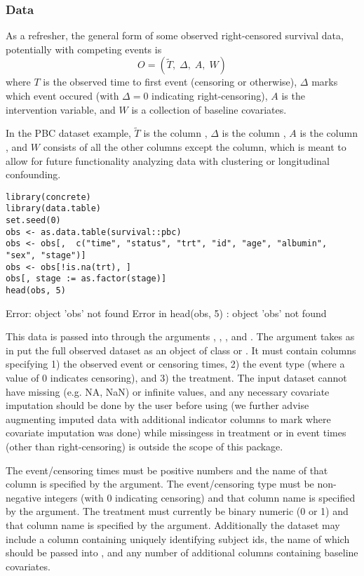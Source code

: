\documentclass{report}
\newcommand{\1}{\ensuremath{\mathbf{1}}}
\newcommand{\T}{\ensuremath{\widetilde{T}}}
\renewcommand{\L}{\ensuremath{W}}
\begin{document}
\subsubsection{Data}
\label{ObservedDataConcrete}
As a refresher, the general form of some observed right-censored survival data, potentially with competing events is
\[ O = \left( \T ,\; \Delta ,\; A ,\; \L  \right) \]
where \(T\) is the observed time to first event (censoring or otherwise), \(\Delta\) marks which event occured (with \(\Delta = 0\) indicating right-censoring), \(A\) is the intervention variable, and \(\L\) is a collection of baseline covariates.

In the PBC dataset example, \(\T\) is the column , \(\Delta\) is the column , \(A\) is the column , and \(\L\) consists of all the other columns except the  column, which is meant to allow for future functionality analyzing data with clustering or longitudinal confounding. 

\begin{lstlisting}
library(concrete)
library(data.table)
set.seed(0)
obs <- as.data.table(survival::pbc)
obs <- obs[,  c("time", "status", "trt", "id", "age", "albumin", "sex", "stage")]
obs <- obs[!is.na(trt), ]
obs[, stage := as.factor(stage)]
head(obs, 5)
\end{lstlisting}

Error: object 'obs' not found
Error in head(obs, 5) : object 'obs' not found

This data is passed into  through the arguments , , , and . The  argument takes as in put the full observed dataset as an object of class  or . It must contain columns specifying 1) the observed event or censoring times, 2) the event type (where a value of 0 indicates censoring), and 3) the treatment. The input dataset cannot have missing (e.g. NA, NaN) or infinite values, and any necessary covariate imputation should be done by the user before using  (we further advise augmenting imputed data with additional indicator columns to mark where covariate imputation was done) while missingess in treatment or in event times (other than right-censoring) is outside the scope of this package.

The event/censoring times must be positive numbers and the name of that column is specified by the  argument. The event/censoring type must be non-negative integers (with 0 indicating censoring) and that column name is specified by the  argument. The treatment must currently be binary numeric (0 or 1) and that column name is specified by the  argument. Additionally the dataset may include a column containing uniquely identifying subject ids, the name of which should be passed into , and any number of additional columns containing baseline covariates.
\end{document}
